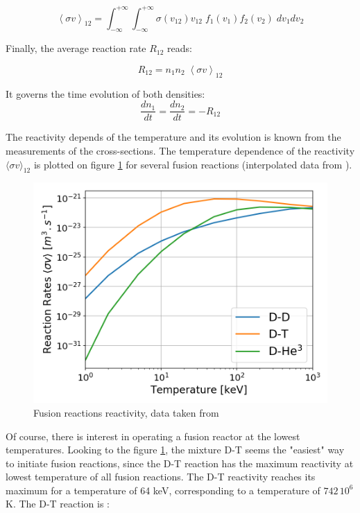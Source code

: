 \begin{equation*}
\left < \sigma v \right >_{12} 
= \int_{-\infty}^{+\infty} \int_{-\infty}^{+\infty} 
\sigma(v_{12}) v_{12}\;  f_1(v_1) f_2(v_2) \; dv_1dv_2
\end{equation*}

Finally, the average reaction rate $R_{12}$ reads:

\begin{equation*}
R_{12} = n_1 n_2 \; \left < \sigma v \right >_{12}
\end{equation*}

It governs the time evolution of both densities: 
$$
\frac{dn_1}{dt} = \frac{dn_2}{dt} = -R_{12}
$$



The reactivity depends of the temperature and its evolution is known from the measurements of the cross-sections. The temperature dependence of the reactivity $\langle \sigma v \rangle_{12}$ is plotted on figure \ref{fig:reactivity_adv} for several fusion reactions (interpolated data from ). 

\begin{figure}
	\includegraphics[width=1\textwidth]{figures/Fusion_Reactivity.png}
	\caption{Fusion reactions reactivity, data taken from \cite{Huba2013} }
	\label{fig:reactivity_adv}
\end{figure}

Of course, there is interest in operating a fusion reactor at the lowest temperatures. Looking to the figure \ref{fig:reactivity_adv}, the mixture D-T seems the "easiest" way to initiate fusion reactions, since the D-T reaction  has the maximum reactivity at lowest temperature of all fusion reactions. The D-T reactivity reaches its maximum for a temperature of 64 keV, corresponding to a temperature of $742\,10^6$ K. The D-T reaction is : 

